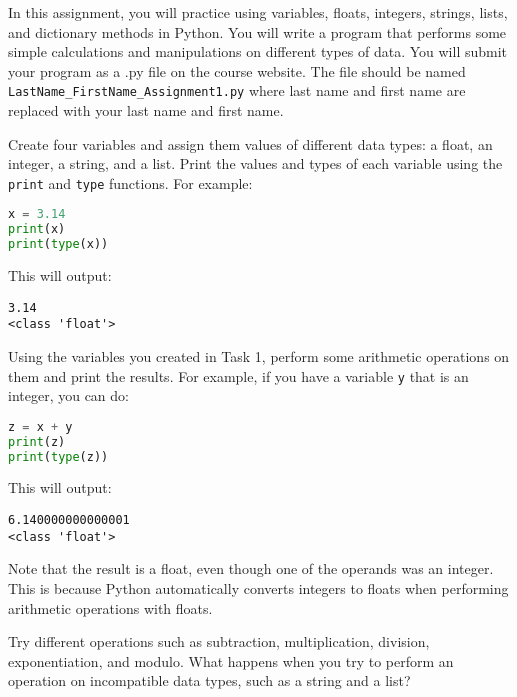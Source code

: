 \documentclass{homework}
\begin{document}
\maketitle

In this assignment, you will practice using variables, floats, integers, strings, lists, and dictionary methods in Python. You will write a program that performs some simple calculations and manipulations on different types of data. You will submit your program as a .py file on the course website. The file should be named \texttt{LastName\_FirstName\_Assignment1.py} where last name and first name are replaced with your last name and first name.\\

\begin{problem}

Create four variables and assign them values of different data types: a float, an integer, a string, and a list. Print the values and types of each variable using the \texttt{print} and \texttt{type} functions. For example:

\begin{lstlisting}[language=Python]
x = 3.14
print(x)
print(type(x))
\end{lstlisting}

This will output:

\begin{lstlisting}[style=output]
3.14
<class 'float'>
\end{lstlisting}

\end{problem}

\begin{problem}

Using the variables you created in Task 1, perform some arithmetic operations on them and print the results. For example, if you have a variable \texttt{y} that is an integer, you can do:

\begin{lstlisting}[language=Python]
z = x + y
print(z)
print(type(z))
\end{lstlisting}

This will output:

\begin{lstlisting}[style=output]
6.140000000000001
<class 'float'>
\end{lstlisting}

Note that the result is a float, even though one of the operands was an integer. This is because Python automatically converts integers to floats when performing arithmetic operations with floats.

Try different operations such as subtraction, multiplication, division, exponentiation, and modulo. What happens when you try to perform an operation on incompatible data types, such as a string and a list?

\end{problem}
\end{document}
